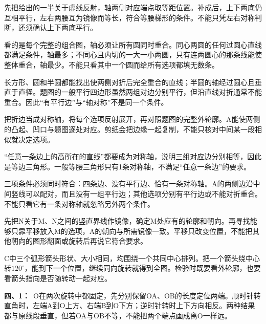 \documentclass[multi=snippet,border=0pt]{standalone}
\newenvironment{snippet}[3]{\begin{minipage}{#1bp}\color{answerred}\fontsize{#2}{#3}\selectfont\raggedright}{\end{minipage}}
\begin{document}
\begin{snippet}{505}{11.5}{14}先把给出的一半关于虚线反射，轴两侧对应端点取等距位置。补成后，上下两底仍互相平行，左右两腰互为镜像而等长，符合等腰梯形的条件。不能只凭左右对称判断，还须确认上下两底平行。\end{snippet}
\begin{snippet}{505}{11.5}{14}看的是每个完整的组合图，轴必须让所有圆同时重合。同心两圆的任何过圆心直线都满足条件，轴最多；不同心且内切的一大一小两圆，只有连两圆心的那条线能使整体重合，轴最少。不能只看其中一个圆而给所有选项都填无数条。\end{snippet}
\begin{snippet}{505}{11.5}{14}长方形、圆和半圆都能找出使两侧对折后完全重合的直线；半圆的轴经过圆心且垂直于直径。题图的一般平行四边形虽然两组对边分别平行，但沿直线对折通常不能重合。因此“有平行边”与“轴对称”不是同一个条件。\end{snippet}
\begin{snippet}{505}{11.5}{14}把折边当成对称轴，将每个选项反射展开，再对照题图的完整外轮廓。A能使两侧的凸起、凹口与题图逐处对应。剪纸会把边缘一起复制，不能只核对中间某一段相似就决定选项。\end{snippet}
\begin{snippet}{505}{11.5}{14}“任意一条边上的高所在的直线”都要成为对称轴，说明三组对应边分别相等，因此是等边三角形。一般等腰三角形只有1条对称轴，不满足“任意一条边”的要求。\end{snippet}
\begin{snippet}{505}{11.5}{14}三项条件必须同时符合：四条边、没有平行边、恰有一条对称轴。A的两侧边沿中间竖线可以配对，而且没有一组平行边；其他选项分别有平行边或不能对折重合。不能只看它有一条对称轴就忽略另外两个条件。\end{snippet}
\begin{snippet}{505}{11.5}{14}先把N关于M、N之间的竖直界线作镜像，确定M处应有的轮廓和朝向。再寻找能够只靠平移放入M的选项，A的朝向与所需镜像一致。平移只改变位置，不能把其他朝向的图形翻面或旋转后再说它符合要求。\end{snippet}
\begin{snippet}{505}{11.5}{14}C中三个弧形箭头形状、大小相同，均围绕一个共同中心排列。把一个箭头绕中心转\(120^\circ\)，能到下一个位置，继续同向旋转就得到全图。检验时既要看外轮廓，也要看箭头指向是否随转动一起对应。\end{snippet}
\begin{snippet}{505}{11.5}{14}\textbf{四、1：}\ O在两次旋转中都固定，先分别保留OA、OB的长度定位两端。顺时针转直角时，左端A到O上方、右端B到O下方；逆时针转时上下方向相反。两种结果都与原线段垂直，但若OA与OB不等，不能把两个端点画成离O一样远。\end{snippet}
\end{document}
